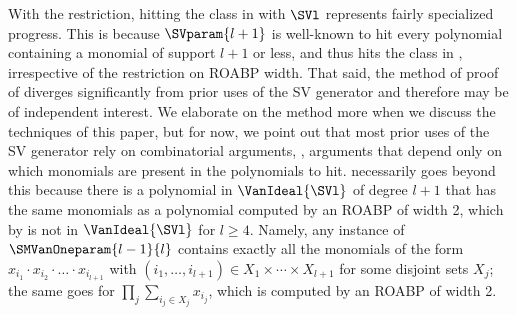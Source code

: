 With the restriction, 
hitting the class in  with $\SVl$ represents fairly specialized progress. This is because $\SVparam{l+1}$ is well-known to hit every polynomial containing a monomial of support $l+1$ or less, and thus hits the class in , irrespective of the restriction on ROABP width. That said, the method of proof of  diverges
significantly from prior uses of the SV generator
and therefore may be of independent interest.
We elaborate on the method more when we discuss the techniques of this paper, but for now,
we point out that most prior uses of the SV generator rely on combinatorial
arguments,
\ie, arguments that depend only on which monomials are present in
the polynomials to hit.
 necessarily goes beyond this
because there is a polynomial in \(\VanIdeal{\SVl}\) of degree \(l+1\) that
has the same monomials as a polynomial computed by an ROABP of width 2, which by  is not in \(\VanIdeal{\SVl}\) for $l \ge 4$.
Namely, any instance of \(\SMVanOneparam{l-1}{l}\) contains exactly all the
monomials of the form \(x_{i_1}\cdot x_{i_2}\cdot \dots \cdot x_{i_{l+1}}\)
with \((i_1,\ldots,i_{l+1})\in X_1\times \cdots \times X_{l+1}\) for some
disjoint sets \(X_j\);
the same goes for \(\prod_j \sum_{i_j\in X_j} x_{i_j}\),
which is computed by an ROABP of width 2.

